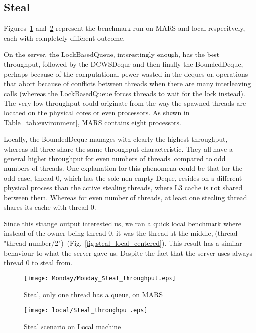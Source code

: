 \documentclass [10pt]{scrartcl}
\begin{document}
   
   \subsection{Steal}
   Figures~\ref{fig:steal_mars} and~\ref{fig:steal_local} represent the benchmark run on MARS and local respecitvely, each with completely different outcome.
   
   On the server, the LockBasedQueue, interestingly enough, has the best throughput, followed by the DCWSDeque and then finally the BoundedDeque, perhaps because of the computational power wasted in the deques on operations that abort because of conflicts between threads when there are many interleaving calls (whereas the LockBasedQueue forces threads to wait for the lock instead). The very low throughput could originate from the way the spawned threads are located on the physical cores or even processors. As shown in Table~\ref{tab:environment}, MARS contains eight processors.
   
   Locally, the BoundedDeque manages with clearly the highest throughput, whereas all three share the same throughput characteristic. They all have a general higher throughput for even numbers of threads, compared to odd numbers of threads. One explanation for this phenomena could be that for the odd case, thread 0, which has the sole non-empty Deque, resides on a different physical process than the active stealing threads, where L3 cache is not shared between them. Whereas for even number of threads, at least one stealing thread shares its cache with thread 0. 
   
   Since this strange output interested us, we ran a quick local benchmark where instead of the owner being thread 0, it was the thread at the middle, (thread "thread number/2")~(Fig.~\ref{fig:steal_local_centered}).
   This result has a similar behaviour to what the server gave us. Despite the fact that the server uses always thread 0 to steal from.
   
   
   \begin{figure}
      \centering
      \texttt{[image: Monday/Monday\_Steal\_throughput.eps]}
      \caption{Steal, only one thread has a queue, on MARS}
      \label{fig:steal_mars}
   \end{figure}
   
   
   \begin{figure}
      \centering
      \texttt{[image: local/Steal\_throughput.eps]}
      \caption{Steal scenario on Local machine}
      \label{fig:steal_local}
   \end{figure}
   
\end{document}
